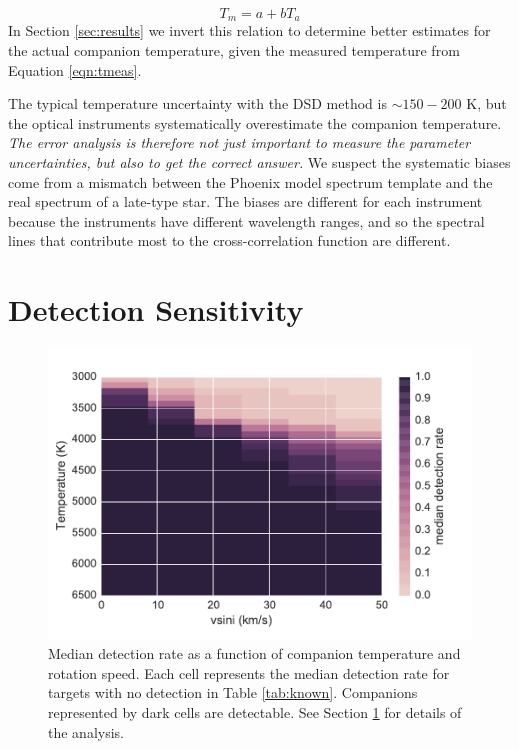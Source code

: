 \documentclass{emulateapj}
\begin{document}
\begin{equation}
T_m = a + bT_a
\end{equation}
In Section \ref{sec:results} we invert this relation to determine better estimates for the actual companion temperature, given the measured temperature from Equation \ref{eqn:tmeas}.

The typical temperature uncertainty with the DSD method is $\sim 150 - 200$ K, but the optical instruments systematically overestimate the companion temperature. \emph{The error analysis is therefore not just important to measure the parameter uncertainties, but also to get the correct answer.} We suspect the systematic biases come from a mismatch between the Phoenix model spectrum template and the real spectrum of a late-type star. The biases are different for each instrument because the instruments have different wavelength ranges, and so the spectral lines that contribute most to the cross-correlation function are different. 



\section{Detection Sensitivity}
\label{subsec:sensitivity}



\begin{figure}
  \centering
  \includegraphics[width=\columnwidth]{vsini_temperature_detection_rate_median.pdf}
  \caption{Median detection rate as a function of companion temperature and rotation speed. Each cell represents the median detection rate for targets with no detection in Table \ref{tab:known}. Companions represented by dark cells are detectable. See Section \ref{subsec:sensitivity} for details of the analysis.}
  \label{fig:sensitivity_2d}
\end{figure}
\end{document}
